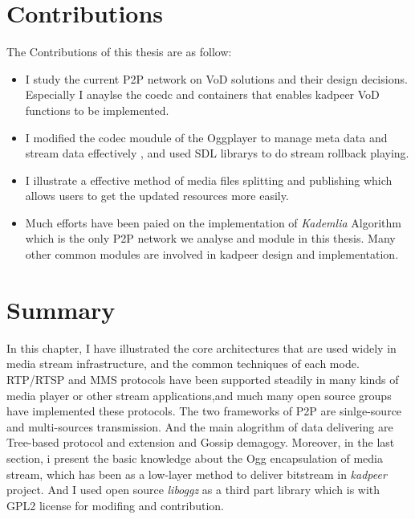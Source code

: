 \section{Contributions}
{
  The Contributions of this thesis are as follow:
\begin{itemize}
\item I study the current P2P network on VoD solutions and their design decisions. Especially I anaylse the coedc and containers that enables kadpeer VoD functions to be implemented.
\item I modified the codec moudule of the Oggplayer to manage meta data and stream data effectively , and used SDL librarys to do stream rollback playing.
\item I illustrate a effective method of media files splitting and publishing which allows users to get the updated resources more easily.
\item Much efforts have been paied on the implementation of \emph{Kademlia} Algorithm which is the only P2P network we analyse and module in this thesis. Many other common modules are involved in kadpeer design and implementation.
\end{itemize}
}
\section{Summary}
{
In this chapter, I have illustrated the core architectures that are used widely in media stream infrastructure, and the common techniques of each mode. 
RTP/RTSP and MMS protocols have been supported steadily in many kinds of media player or other stream applications,and much many open source groups have implemented these protocols. 
The two frameworks of P2P are sinlge-source and multi-sources transmission. And the main alogrithm of data delivering are Tree-based protocol and extension and Gossip demagogy.
Moreover, in the last section, i present the basic knowledge about the Ogg encapsulation of media stream, which has been as a low-layer method to deliver bitstream in \emph{kadpeer} project. And I used open source \emph{liboggz} as a third part library which is with GPL2 license for modifing and contribution.
}
